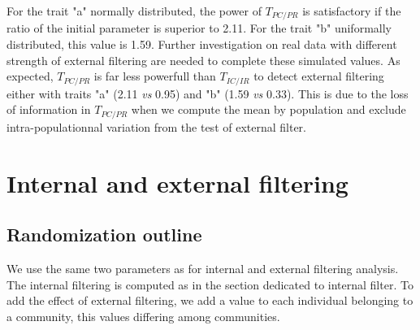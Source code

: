 \documentclass[12pt]{article}\usepackage[]{graphicx}\usepackage[]{color}
\begin{document}
For the trait "a" normally distributed, the power of $T_{PC/PR}$ is satisfactory if the ratio of the initial parameter is superior to
 2.11. For the trait "b" uniformally distributed, this value is 1.59. 
 Further investigation on real data with different strength of external filtering are needed to complete these simulated values. As expected, $T_{PC/PR}$ is far less powerfull than $T_{IC/IR}$ to detect external filtering either with traits "a" (2.11 \textit{vs} 0.95) and "b" (1.59 \textit{vs} 0.33). This is due to the loss of information in $T_{PC/PR}$ when we compute the mean by population and exclude intra-populationnal variation from the test of external filter. 




































\cleardoublepage

\section{Internal and external filtering}
\label{sect:IntExtFilt}

  \subsection{Randomization outline}
We use the same two parameters as for internal and external filtering analysis. The internal filtering is computed as in the section dedicated to internal filter. To add the effect of external filtering, we add a value to each individual belonging to a community, this values differing among communities.
\end{document}
